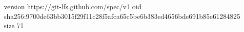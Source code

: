 version https://git-lfs.github.com/spec/v1
oid sha256:9700de63bb3015f29f11c28f5afca65c5be6b383ed4656bde691b85e61284825
size 71
